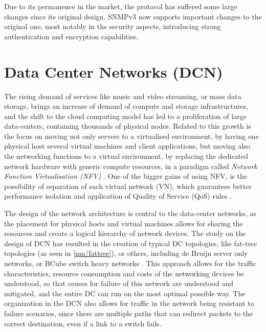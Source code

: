 \par Due to its permanence in the market, the protocol has suffered some large changes since its original design. SNMPv3 now supports important changes to the original one, most notably in the security aspects, introducing strong
authentication and encryption capabilities.

\section {Data Center Networks (DCN)}

\par The rising demand of services like music and video streaming, or mass data storage, brings an increase of demand of compute and storage infrastructures, and the shift to the cloud computing model has led to a
proliferation of large data-centers, containing thousands of physical nodes. Related to this growth is the focus on moving not only servers to a virtualised environment, by having one physical host several virtual machines and
client applications, but moving also the networking functions to a virtual environment, by replacing the dedicated network hardware with generic compute resources, in a paradigm called \textit{Network Function Virtualisation (NFV)} 
\cite {CITE - OPENSDWN}. One of the bigger gains of using NFV, is the possibility of separation of each virtual network (VN), which guarantees better performance isolation and application of Quality of Service (QoS) rules
\cite {CITE - Data center virtualisation a survey}. 
\par The design of the network architecture is central to the data-center networks, as the placement for physical hosts and virtual machines allows for sharing the resources and create a logical hierarchy of network devices. The 
study on the design of DCN has resulted in the creation of typical DC topologies, like fat-tree topologies (as seen in \ref {nm/fattree}), or others, including de Bruijn server only networks, or BCube switch heavy networks 
\cite{ popa_cost_2010 }. This approach allows for the traffic characteristics, resource consumption and costs of the networking devices be understood, so that causes for failure of this network are understood and mitigated, 
and the entire DC can run on the most optimal possible way. The organization in the DCN also allows for traffic in the network being resistant to failure scenarios, since there are multiple paths that can redirect packets 
to the correct destination, even if a link to a switch fails.

